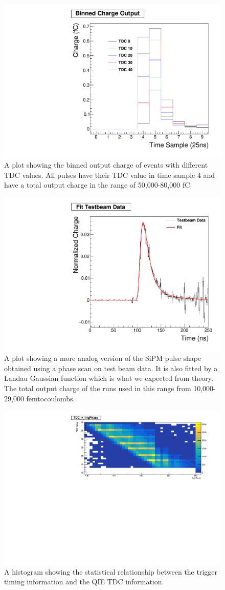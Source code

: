 \begin{figure}
\centering
\includegraphics[width=0.6\linewidth]{Figures/Phase.pdf}
\caption{A plot showing the binned output charge of events with different TDC values. All pulses have their TDC value in time sample 4 and have a total output charge in the range of 50,000-80,000 fC}
\label{fig:Phase}
\end{figure}

\begin{figure}
\centering
\includegraphics[width=0.6\linewidth]{Figures/FittedPlot.pdf}
\caption{A plot showing a more analog version of the SiPM pulse shape obtained using a phase scan on test beam data. It is also fitted by a Landau Gaussian function which is what we expected from theory. The total output charge of the runs used in this range from 10,000-29,000 femtocoulombs.}
\label{fig:fit}
\end{figure}

\begin{figure}
\centering
\includegraphics[width=\linewidth]{Figures/TDCvTrigPhase.pdf}
\caption{A histogram showing the statistical relationship between the trigger timing information and the QIE TDC information.}
\label{fig:tdc}
\end{figure}

